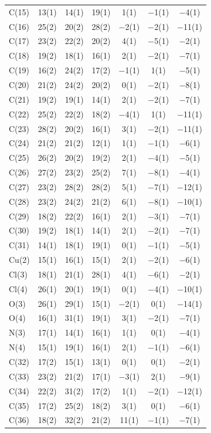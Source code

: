 \begin{center}
{\begin{supertabular}{lcccccc}
C(15)&13(1) &14(1)&19(1) &1(1)&$-$1(1) &$-$4(1)\\
C(16)&25(2) &20(2)&28(2) &$-$2(1)&$-$2(1) &$-$11(1)\\
C(17)&23(2) &22(2)&20(2) &4(1)&$-$5(1) &$-$2(1)\\
C(18)&19(2) &18(1)&16(1) &2(1)&$-$2(1) &$-$7(1)\\
C(19)&16(2) &24(2)&17(2) &$-$1(1)&1(1) &$-$5(1)\\
C(20)&21(2) &24(2)&20(2) &0(1)&$-$2(1) &$-$8(1)\\
C(21)&19(2) &19(1)&14(1) &2(1)&$-$2(1) &$-$7(1)\\
C(22)&25(2) &22(2)&18(2) &$-$4(1)&1(1) &$-$11(1)\\
C(23)&28(2) &20(2)&16(1) &3(1)&$-$2(1) &$-$11(1)\\
C(24)&21(2) &21(2)&12(1) &1(1)&$-$1(1) &$-$6(1)\\
C(25)&26(2) &20(2)&19(2) &2(1)&$-$4(1) &$-$5(1)\\
C(26)&27(2) &23(2)&25(2) &7(1)&$-$8(1) &$-$4(1)\\
C(27)&23(2) &28(2)&28(2) &5(1)&$-$7(1) &$-$12(1)\\
C(28)&23(2) &24(2)&21(2) &6(1)&$-$8(1) &$-$10(1)\\
C(29)&18(2) &22(2)&16(1) &2(1)&$-$3(1) &$-$7(1)\\
C(30)&19(2) &18(1)&14(1) &2(1)&$-$2(1) &$-$7(1)\\
C(31)&14(1) &18(1)&19(1) &0(1)&$-$1(1) &$-$5(1)\\
Cu(2)&15(1) &16(1)&15(1) &2(1)&$-$2(1) &$-$6(1)\\
Cl(3)&18(1) &21(1)&28(1) &4(1)&$-$6(1) &$-$2(1)\\
Cl(4)&26(1) &20(1)&19(1) &0(1)&$-$4(1) &$-$10(1)\\
O(3)&26(1) &29(1)&15(1) &$-$2(1)&0(1) &$-$14(1)\\
O(4)&16(1) &31(1)&19(1) &3(1)&$-$2(1) &$-$7(1)\\
N(3)&17(1) &14(1)&16(1) &1(1)&0(1) &$-$4(1)\\
N(4)&15(1) &19(1)&16(1) &2(1)&$-$1(1) &$-$6(1)\\
C(32)&17(2) &15(1)&13(1) &0(1)&0(1) &$-$2(1)\\
C(33)&23(2) &21(2)&17(1) &$-$3(1)&2(1) &$-$9(1)\\
C(34)&22(2) &31(2)&17(2) &1(1)&$-$2(1) &$-$12(1)\\
C(35)&17(2) &25(2)&18(2) &3(1)&0(1) &$-$6(1)\\
C(36)&18(2) &32(2)&21(2) &11(1)&$-$1(1) &$-$7(1)\\

\end{supertabular}}
\end{center}
